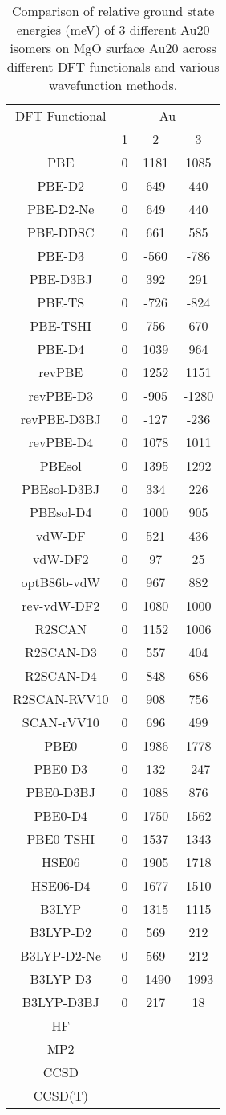 \begin{table}[ht]
\centering
\caption{Comparison of relative ground state energies (meV) of 3 different Au20 isomers on MgO surface Au20 across different DFT functionals and various wavefunction methods.}
\begin{tabular}{cccc}
\hline\hline
DFT Functional & \multicolumn{3}{c}{Au} \\ 
\cline{2-4}
 & 1 & 2 & 3 \\ \hline
PBE & 0 & 1181 & 1085 \\ 
PBE-D2 & 0 & 649 & 440 \\ 
PBE-D2-Ne & 0 & 649 & 440 \\ 
PBE-DDSC & 0 & 661 & 585 \\ 
PBE-D3 & 0 & -560 & -786 \\ 
PBE-D3BJ & 0 & 392 & 291 \\ 
PBE-TS & 0 & -726 & -824 \\ 
PBE-TSHI & 0 & 756 & 670 \\ 
PBE-D4 & 0 & 1039 & 964 \\ 
revPBE & 0 & 1252 & 1151 \\ 
revPBE-D3 & 0 & -905 & -1280 \\ 
revPBE-D3BJ & 0 & -127 & -236 \\ 
revPBE-D4 & 0 & 1078 & 1011 \\ 
PBEsol & 0 & 1395 & 1292 \\ 
PBEsol-D3BJ & 0 & 334 & 226 \\ 
PBEsol-D4 & 0 & 1000 & 905 \\ 
vdW-DF & 0 & 521 & 436 \\ 
vdW-DF2 & 0 & 97 & 25 \\ 
optB86b-vdW & 0 & 967 & 882 \\ 
rev-vdW-DF2 & 0 & 1080 & 1000 \\ 
R2SCAN & 0 & 1152 & 1006 \\ 
R2SCAN-D3 & 0 & 557 & 404 \\ 
R2SCAN-D4 & 0 & 848 & 686 \\ 
R2SCAN-RVV10 & 0 & 908 & 756 \\ 
SCAN-rVV10 & 0 & 696 & 499 \\ 
PBE0 & 0 & 1986 & 1778 \\ 
PBE0-D3 & 0 & 132 & -247 \\ 
PBE0-D3BJ & 0 & 1088 & 876 \\ 
PBE0-D4 & 0 & 1750 & 1562 \\ 
PBE0-TSHI & 0 & 1537 & 1343 \\ 
HSE06 & 0 & 1905 & 1718 \\ 
HSE06-D4 & 0 & 1677 & 1510 \\ 
B3LYP & 0 & 1315 & 1115 \\ 
B3LYP-D2 & 0 & 569 & 212 \\ 
B3LYP-D2-Ne & 0 & 569 & 212 \\ 
B3LYP-D3 & 0 & -1490 & -1993 \\ 
B3LYP-D3BJ & 0 & 217 & 18 \\ 
HF &  \\ 
MP2 &  \\ 
CCSD &  \\ 
CCSD(T) &  \\ 
\hline\hline
\end{tabular}
\end{table}